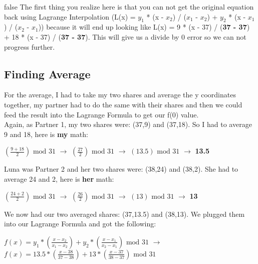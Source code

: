 \documentclass[10pt]{article}
\begin{document}
\if false
The first thing you realize here is that you can not get the original equation back using Lagrange Interpolation (L(x) = $y_1$ * (x - $x_2$) / ($x_1$ - $x_2$) + $y_2$ * (x - $x_1$) / ($x_2$ - $x_1$)) because it will end up looking like L(x) = 9 * (x - 37) / (\textbf{37 - 37}) + 18 * (x - 37) / (\textbf{37 - 37}). This will give us a divide by 0 error so we can not progress further. 
\fi

\vspace{0.2in}
\subsection{Finding Average}
\noindent For the average, I had to take my two shares and average the y coordinates together, my partner had to do the same with their shares and then we could feed the result into the Lagrange Formula to get our f(0) value.\\
Again, as Partner 1, my two shares were: (37,9) and (37,18). 
So I had to average 9 and 18, here is \textbf{my} math:\\ \vspace{0.1in}

$\left(\frac{9+18}{2}\right) \textrm{ mod } 31$ $\rightarrow$
$\left(\frac{27}{2}\right) \textrm{ mod } 31$ $\rightarrow$ 
$\left(13.5\right) \textrm{ mod } 31$ $\rightarrow$ \textbf{13.5}\\
\newline

\noindent Luna was Partner 2 and her two shares were: (38,24) and (38,2). 
She had to average 24 and 2, here is \textbf{her} math:\\ \vspace{0.1in}

$\left(\frac{24+2}{2}\right) \textrm{ mod } 31$ $\rightarrow$
$\left(\frac{26}{2}\right) \textrm{ mod } 31$ $\rightarrow$ 
$\left(13\right) \textrm{ mod } 31$ $\rightarrow$ \textbf{13}\\
\newline

\noindent We now had our two averaged shares: (37,13.5) and (38,13). We plugged them into our Lagrange Formula and got the following:\\ \vspace{0.1in}

$f(x) = y_1*\left(\frac{x - x_2}{x_1 - x_2}\right) + y_2*\left(\frac{x - x_1}{x_2 - x_1}\right) \textrm{ mod } 31$ 
$\rightarrow$
$f(x) = 13.5*\left(\frac{x - 38}{37 - 38}\right) + 13*\left(\frac{x - 37}{38 - 37}\right) \textrm{ mod } 31$\\
\end{document}

